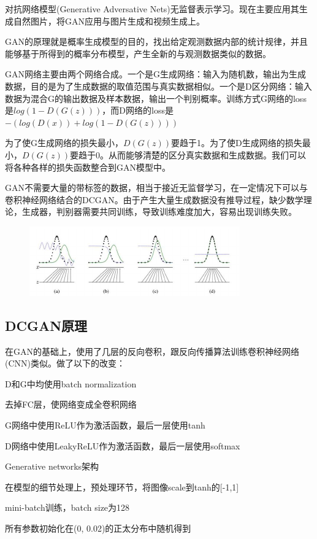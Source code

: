 \documentclass[openbib]{article}
\begin{document}
对抗网络模型(Generative Adversative Nets)无监督表示学习。现在主要应用其生成自然图片，将GAN应用与图片生成和视频生成上。

GAN的原理就是概率生成模型的目的，找出给定观测数据内部的统计规律，并且能够基于所得到的概率分布模型，产生全新的与观测数据类似的数据。

GAN网络主要由两个网络合成。一个是G生成网络：输入为随机数，输出为生成数据，目的是为了生成数据的取值范围与真实数据相似。一个是D区分网络：输入数据为混合G的输出数据及样本数据，输出一个判别概率。训练方式G网络的loss是$log(1-D(G(z)))$，而D网络的loss是$-(log(D(x))+log(1-D(G(z))))$

为了使G生成网络的损失最小，$D(G(z))$要趋于1。为了使D生成网络的损失最小，$D(G(z))$要趋于0。从而能够清楚的区分真实数据和生成数据。我们可以将各种各样的损失函数整合到GAN模型中。

GAN不需要大量的带标签的数据，相当于接近无监督学习，在一定情况下可以与卷积神经网络结合的DCGAN。由于产生大量生成数据没有推导过程，缺少数学理论，生成器，判别器需要共同训练，导致训练难度加大，容易出现训练失败。

\begin{figure}[htbp]
	\centering
	\includegraphics[scale=0.85]{GAN的训练过程}
\end{figure}

\subsection{DCGAN原理}
在GAN的基础上，使用了几层的反向卷积，跟反向传播算法训练卷积神经网络(CNN)类似。做了以下的改变：

D和G中均使用batch normalization

去掉FC层，使网络变成全卷积网络

G网络中使用ReLU作为激活函数，最后一层使用tanh

D网络中使用LeakyReLU作为激活函数，最后一层使用softmax

Generative networks架构

在模型的细节处理上，预处理环节，将图像scale到tanh的[-1,1]

mini-batch训练，batch size为128

所有参数初始化在(0, 0.02)的正太分布中随机得到
\end{document}
